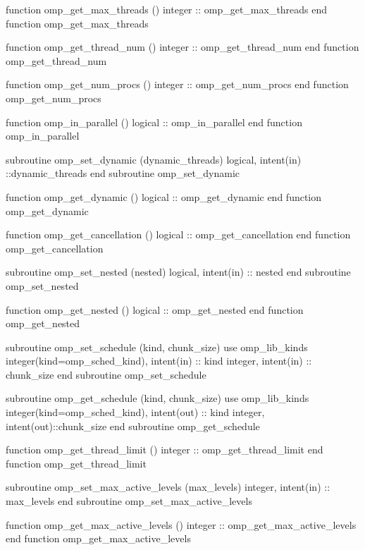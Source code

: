 {{\begin{codepar}
          function omp\_get\_max\_threads ()
           integer :: omp\_get\_max\_threads
          end function omp\_get\_max\_threads

          function omp\_get\_thread\_num ()
           integer :: omp\_get\_thread\_num
          end function omp\_get\_thread\_num

          function omp\_get\_num\_procs ()
           integer :: omp\_get\_num\_procs
          end function omp\_get\_num\_procs

          function omp\_in\_parallel ()
           logical :: omp\_in\_parallel
          end function omp\_in\_parallel

          subroutine omp\_set\_dynamic (dynamic\_threads)
           logical, intent(in) ::dynamic\_threads
          end subroutine omp\_set\_dynamic

          function omp\_get\_dynamic ()
           logical :: omp\_get\_dynamic
          end function omp\_get\_dynamic

          function omp\_get\_cancellation ()
           logical :: omp\_get\_cancellation
          end function omp\_get\_cancellation

          subroutine omp\_set\_nested (nested)
           logical, intent(in) :: nested
          end subroutine omp\_set\_nested

          function omp\_get\_nested ()
           logical :: omp\_get\_nested
          end function omp\_get\_nested

          subroutine omp\_set\_schedule (kind, chunk\_size)
           use omp\_lib\_kinds
           integer(kind=omp\_sched\_kind), intent(in) :: kind
           integer, intent(in) :: chunk\_size
          end subroutine omp\_set\_schedule

          subroutine omp\_get\_schedule (kind, chunk\_size)
           use omp\_lib\_kinds
           integer(kind=omp\_sched\_kind), intent(out) :: kind
           integer, intent(out)::chunk\_size
          end subroutine omp\_get\_schedule

          function omp\_get\_thread\_limit ()
           integer :: omp\_get\_thread\_limit
          end function omp\_get\_thread\_limit

          subroutine omp\_set\_max\_active\_levels (max\_levels)
           integer, intent(in) :: max\_levels
          end subroutine omp\_set\_max\_active\_levels

          function omp\_get\_max\_active\_levels ()
           integer :: omp\_get\_max\_active\_levels
          end function omp\_get\_max\_active\_levels


\end{codepar}}}
